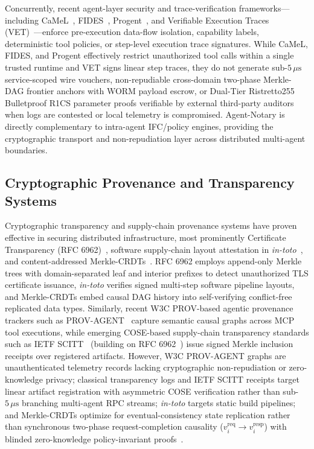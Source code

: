 \documentclass[conference,10pt]{IEEEtran}
\begin{document}
Concurrently, recent agent-layer security and trace-verification frameworks---including CaMeL~\cite{debenedetti2025camel}, FIDES~\cite{costa2025fides}, Progent~\cite{shi2025progent}, and Verifiable Execution Traces (VET)~\cite{grigor2025vet}---enforce pre-execution data-flow isolation, capability labels, deterministic tool policies, or step-level execution trace signatures. While CaMeL, FIDES, and Progent effectively restrict unauthorized tool calls within a single trusted runtime and VET signs linear step traces, they do not generate sub-$5\,\mu\text{s}$ service-scoped wire vouchers, non-repudiable cross-domain two-phase Merkle-DAG frontier anchors with WORM payload escrow, or Dual-Tier Ristretto255 Bulletproof R1CS parameter proofs verifiable by external third-party auditors when logs are contested or local telemetry is compromised. Agent-Notary is directly complementary to intra-agent IFC/policy engines, providing the cryptographic transport and non-repudiation layer across distributed multi-agent boundaries.

\subsection{Cryptographic Provenance and Transparency Systems}
Cryptographic transparency and supply-chain provenance systems have proven effective in securing distributed infrastructure, most prominently Certificate Transparency (RFC 6962)~\cite{laurie2014certificate}, software supply-chain layout attestation in \textit{in-toto}~\cite{torres2019intoto}, and content-addressed Merkle-CRDTs~\cite{sanjuan2020merkle}. RFC 6962 employs append-only Merkle trees with domain-separated leaf and interior prefixes to detect unauthorized TLS certificate issuance, \textit{in-toto} verifies signed multi-step software pipeline layouts, and Merkle-CRDTs embed causal DAG history into self-verifying conflict-free replicated data types. Similarly, recent W3C PROV-based agentic provenance trackers such as PROV-AGENT~\cite{souza2025provagent} capture semantic causal graphs across MCP tool executions, while emerging COSE-based supply-chain transparency standards such as IETF SCITT~\cite{birkholz2026scitt} (building on RFC 6962~\cite{laurie2014certificate}) issue signed Merkle inclusion receipts over registered artifacts. However, W3C PROV-AGENT graphs are unauthenticated telemetry records lacking cryptographic non-repudiation or zero-knowledge privacy; classical transparency logs and IETF SCITT receipts target linear artifact registration with asymmetric COSE verification rather than sub-$5\,\mu\text{s}$ branching multi-agent RPC streams; \textit{in-toto} targets static build pipelines; and Merkle-CRDTs optimize for eventual-consistency state replication rather than synchronous two-phase request-completion causality ($v_i^{\text{req}} \to v_i^{\text{resp}}$) with blinded zero-knowledge policy-invariant proofs~\cite{lamport1978time}.
\end{document}
